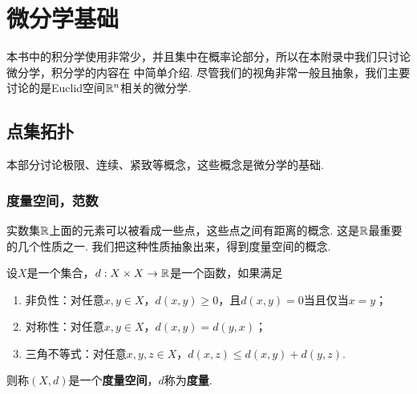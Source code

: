 \chapter{微分学基础}\label{chap:calculus}
本书中的积分学使用非常少，并且集中在概率论部分，所以在本附录中我们只讨论微分学，积分学的内容在 中简单介绍. 尽管我们的视角非常一般且抽象，我们主要讨论的是Euclid空间$\mathbb{R}^n$相关的微分学. 

\section{点集拓扑}\label{sec:topology}
本部分讨论极限、连续、紧致等概念，这些概念是微分学的基础. 

\subsection{度量空间，范数}\label{subsec:metric-norm}
实数集$\mathbb{R}$上面的元素可以被看成一些点，这些点之间有距离的概念. 这是$\mathbb{R}$最重要的几个性质之一. 我们把这种性质抽象出来，得到度量空间的概念. 

\begin{definition}[度量空间]
设$X$是一个集合，$d:X\times X\to\mathbb{R}$是一个函数，如果满足
\begin{enumerate}
    \item 非负性：对任意$x,y\in X$，$d(x,y)\geq 0$，且$d(x,y)=0$当且仅当$x=y$；
    \item 对称性：对任意$x,y\in X$，$d(x,y)=d(y,x)$；
    \item 三角不等式：对任意$x,y,z\in X$，$d(x,z)\leq d(x,y)+d(y,z)$. 
\end{enumerate}
则称$(X,d)$是一个\textbf{度量空间}，$d$称为\textbf{度量}. 
\end{definition}


